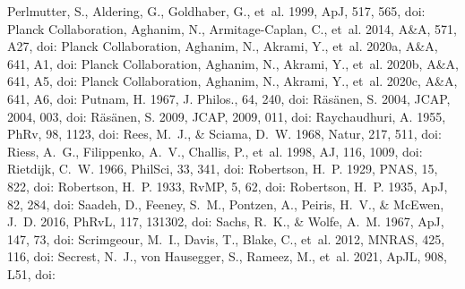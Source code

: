 \documentclass[twocolumn]{aastex701}
\begin{document}
\begin{thebibliography}{}
 Perlmutter, S., Aldering, G., Goldhaber, G., {et~al.} 1999, ApJ, 517, 565, doi:
 {Planck Collaboration}, Aghanim, N., Armitage-Caplan, C., {et~al.} 2014, A\&A, 571, A27, doi:
 {Planck Collaboration}, Aghanim, N., Akrami, Y., {et~al.} 2020a, A\&A, 641, A1, doi:
 {Planck Collaboration}, Aghanim, N., Akrami, Y., {et~al.} 2020b, A\&A, 641, A5, doi:
 {Planck Collaboration}, Aghanim, N., Akrami, Y., {et~al.} 2020c, A\&A, 641, A6, doi:
 Putnam, H. 1967, J. Philos., 64, 240, doi:
 R{\"a}s{\"a}nen, S. 2004, JCAP, 2004, 003, doi:
 R{\"a}s{\"a}nen, S. 2009, JCAP, 2009, 011, doi:
 Raychaudhuri, A. 1955, PhRv, 98, 1123, doi:
 Rees, M.~J., \& Sciama, D.~W. 1968, Natur, 217, 511, doi:
 Riess, A.~G., Filippenko, A.~V., Challis, P., {et~al.} 1998, AJ, 116, 1009, doi:
 Rietdijk, C.~W. 1966, PhilSci, 33, 341, doi:
 Robertson, H.~P. 1929, PNAS, 15, 822, doi:
 Robertson, H.~P. 1933, RvMP, 5, 62, doi:
 Robertson, H.~P. 1935, ApJ, 82, 284, doi:
 Saadeh, D., Feeney, S.~M., Pontzen, A., Peiris, H.~V., \& McEwen, J.~D. 2016, PhRvL, 117, 131302, doi:
 Sachs, R.~K., \& Wolfe, A.~M. 1967, ApJ, 147, 73, doi:
 Scrimgeour, M.~I., Davis, T., Blake, C., {et~al.} 2012, MNRAS, 425, 116, doi:
 Secrest, N.~J., von Hausegger, S., Rameez, M., {et~al.} 2021, ApJL, 908, L51, doi:

\end{thebibliography}
\end{document}

